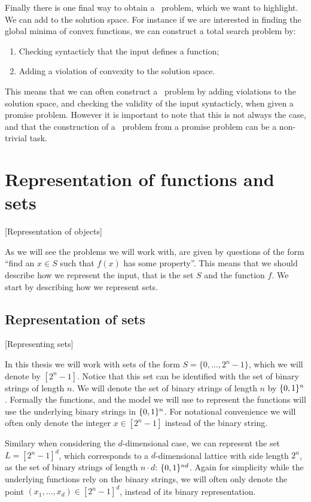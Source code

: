 Finally there is one final way to obtain a \TFNP\ problem, which we want to highlight. We can add  to the solution space. For instance if we are interested in finding the global minima of convex functions, we can construct a total search problem by:
\begin{enumerate}
    \item Checking syntacticly that the input defines a function;
    \item Adding a violation of convexity to the solution space.
\end{enumerate}

This means that we can often construct a \TFNP\ problem by adding violations to the solution space, and checking the validity of the input syntacticly, when given a promise problem. However it is important to note that this is not always the case, and that the construction of a \TFNP\ problem from a promise problem can be a non-trivial task.

\section{Representation of functions and sets}[Representation of objects]

As we will see the problems we will work with, are given by questions of the form ``find an $x \in S$ such that $f(x)$ has some property''. This means that we should describe how we represent the input, that is the set $S$ and the function $f$. We start by describing how we represent sets.

\subsection{Representation of sets}[Representing sets]

In this thesis we will work with sets of the form $S = \{0, \dots, 2^n - 1\}$, which we will denote by $[2^n - 1]$. Notice that this set can be identified with the set of binary strings of length $n$. We will denote the set of binary strings of length $n$ by $\{0, 1\}^n$. Formally the functions, and the model we will use to represent the functions will use the underlying binary strings in $\{0, 1\}^n$. For notational convenience we will often only denote the integer $x \in [2^n - 1]$ instead of the binary string.

Similary when considering the $d$-dimensional case, we can represent the set $L = [2^n - 1]^d$, which corresponds to a $d$-dimensional lattice with side length $2^n$, as the set of binary strings of length $n \cdot d$: $\{0, 1\}^{nd}$. Again for simplicity while the underlying functions rely on the binary strings, we will often only denote the point $(x_1, \dots, x_d) \in [2^n - 1]^d$, instead of its binary representation.

